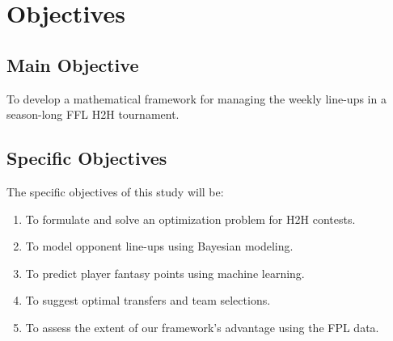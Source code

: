 \documentclass[12pt,oneside,a4paper]{book}
\theoremstyle{definition}
\theoremstyle{remark}
\begin{document}
		\section{Objectives}
			\subsection{Main Objective}
				To develop a mathematical framework for managing the weekly line-ups in a season-long FFL H2H tournament.

			\subsection{Specific Objectives} \label{sec:specific_objectives}
				The specific objectives of this study will be:
				\begin{enumerate}
					\renewcommand{\labelenumi}{(\roman{enumi})}  %
					\renewcommand{\theenumi}{\roman{enumi}}      %
					\item To formulate and solve an optimization problem for H2H contests. \label{obj:formulate}
					\item To model opponent line-ups using Bayesian modeling. \label{obj:opponents}
					\item To predict player fantasy points using machine learning. \label{obj:predict}
					\item To suggest optimal transfers and team selections. \label{obj:transfers}
					\item To assess the extent of our framework's advantage using the FPL data. \label{obj:assess}
				\end{enumerate}
\end{document}
